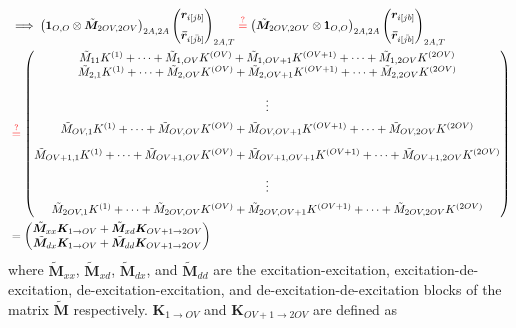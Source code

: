 \begin{align}
    &\implies \left(\bm{1}_{O,O} \otimes \tilde{\bm{M}}_{2OV,2OV} \right)_{2A,2A} \begin{pmatrix}    
    \bm{r}_{i[jb]} \\[6pt]
\bm{\bar{r}}_{i[\bar{jb}]}
\end{pmatrix}_{2A,T} \color{red} \stackrel{?}{=} \color{black}\left( \tilde{\bm{M}}_{2OV,2OV} \otimes \bm{1}_{O,O}\right)_{2A,2A} \begin{pmatrix}    
    \bm{r}_{i[jb]} \\[6pt]
\bm{\bar{r}}_{i[\bar{jb}]}
\end{pmatrix}_{2A,T}\\
& \color{red} \stackrel{?}{=} \color{black}\begin{pmatrix}
\tilde{M}_{11} K^{(1)} + \dots + \tilde{M}_{1,OV} K^{(OV)} + \tilde{M}_{1,OV+1} K^{(OV+1)}+\dots + \tilde{M}_{1,2OV} K^{(2OV)} \\
\tilde{M}_{2,1} K^{(1)} +  \dots + \tilde{M}_{2,OV} K^{(OV)} + \tilde{M}_{2,OV+1} K^{(OV+1)}+\dots + \tilde{M}_{2,2OV} K^{(2OV)} \\[1.2em]
\vdots \\[6pt]
\tilde{M}_{OV,1} K^{(1)} + \dots + \tilde{M}_{OV,OV} K^{(OV)} + \tilde{M}_{OV,OV+1} K^{(OV+1)}+\dots + \tilde{M}_{OV,2OV} K^{(2OV)} \\[1em]
\tilde{M}_{OV+1,1} K^{(1)} + \dots + \tilde{M}_{OV+1,OV} K^{(OV)} + \tilde{M}_{OV+1,OV+1} K^{(OV+1)} + \dots + \tilde{M}_{OV+1,2OV} K^{(2OV)} \\[1em]
\vdots \\[6pt]
\tilde{M}_{2OV,1} K^{(1)} + \dots + \tilde{M}_{2OV,OV} K^{(OV)} + \tilde{M}_{2OV,OV+1} K^{(OV+1)} + \dots + \tilde{M}_{2OV,2OV} K^{(2OV)}\\
\end{pmatrix}\\
&=\begin{pmatrix}
\tilde{\bm{M}}_{xx} \bm{K}_{1\rightarrow OV} + \tilde{\bm{M}}_{xd} \bm{K}_{OV+1\rightarrow 2OV} \\
\tilde{\bm{M}}_{dx} \bm{K}_{1\rightarrow OV} + \tilde{\bm{M}}_{dd} \bm{K}_{OV+1\rightarrow 2OV} \\
\end{pmatrix}
\end{align}
where $\tilde{\bm{M}}_{xx}$, $\tilde{\bm{M}}_{xd}$, $\tilde{\bm{M}}_{dx}$, and $\tilde{\bm{M}}_{dd}$ are the excitation-excitation, excitation-de-excitation, de-excitation-excitation, and de-excitation-de-excitation blocks of the matrix $\tilde{\bm{M}}$ respectively. $\bm{K}_{1\rightarrow OV}$ and $\bm{K}_{OV+1\rightarrow 2OV}$ are defined as
